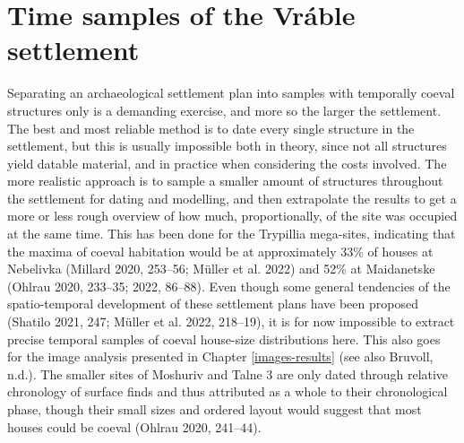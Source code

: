 \documentclass[
  12pt,
  a4paper, twoside]{book}
\begin{document}
\hypertarget{time-samples}{%
\section{Time samples of the Vráble settlement}\label{time-samples}}

Separating an archaeological settlement plan into samples with temporally coeval structures only is a demanding exercise, and more so the larger the settlement. The best and most reliable method is to date every single structure in the settlement, but this is usually impossible both in theory, since not all structures yield datable material, and in practice when considering the costs involved. The more realistic approach is to sample a smaller amount of structures throughout the settlement for dating and modelling, and then extrapolate the results to get a more or less rough overview of how much, proportionally, of the site was occupied at the same time. This has been done for the Trypillia mega-sites, indicating that the maxima of coeval habitation would be at approximately 33\% of houses at Nebelivka (Millard 2020, 253--56; Müller et al. 2022) and 52\% at Maidanetske (Ohlrau 2020, 233--35; 2022, 86--88). Even though some general tendencies of the spatio-temporal development of these settlement plans have been proposed (Shatilo 2021, 247; Müller et al. 2022, 218--19), it is for now impossible to extract precise temporal samples of coeval house-size distributions here. This also goes for the image analysis presented in Chapter \ref{images-results} (see also Bruvoll, n.d.). The smaller sites of Moshuriv and Talne 3 are only dated through relative chronology of surface finds and thus attributed as a whole to their chronological phase, though their small sizes and ordered layout would suggest that most houses could be coeval (Ohlrau 2020, 241--44).
\end{document}
